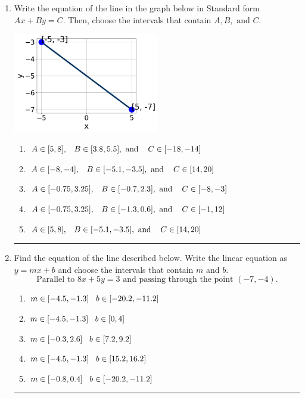 \documentclass[14pt]{extbook}
\newcommand{\litem}[1]{\item#1\hspace*{-1cm}\rule{\textwidth}{0.4pt}}
\begin{document}
\begin{enumerate}
{\begin{enumerate}[label=\Alph*.]
\end{enumerate} }
\litem{
Write the equation of the line in the graph below in Standard form $Ax+By=C$. Then, choose the intervals that contain $A, B, \text{ and } C$.
\begin{center}
    \includegraphics[width=0.5\textwidth]{../Figures/linearGraphToStandardA.png}
\end{center}
\begin{enumerate}[label=\Alph*.]
\item \( A \in [5, 8], \hspace{3mm} B \in [3.8, 5.5], \text{ and } \hspace{3mm} C \in [-18, -14] \)
\item \( A \in [-8, -4], \hspace{3mm} B \in [-5.1, -3.5], \text{ and } \hspace{3mm} C \in [14, 20] \)
\item \( A \in [-0.75, 3.25], \hspace{3mm} B \in [-0.7, 2.3], \text{ and } \hspace{3mm} C \in [-8, -3] \)
\item \( A \in [-0.75, 3.25], \hspace{3mm} B \in [-1.3, 0.6], \text{ and } \hspace{3mm} C \in [-1, 12] \)
\item \( A \in [5, 8], \hspace{3mm} B \in [-5.1, -3.5], \text{ and } \hspace{3mm} C \in [14, 20] \)

\end{enumerate} }
\litem{
Find the equation of the line described below. Write the linear equation as $ y=mx+b $ and choose the intervals that contain $m$ and $b$.\[ \text{Parallel to } 8 x + 5 y = 3 \text{ and passing through the point } (-7, -4). \]\begin{enumerate}[label=\Alph*.]
\item \( m \in [-4.5, -1.3] \hspace*{3mm} b \in [-20.2, -11.2] \)
\item \( m \in [-4.5, -1.3] \hspace*{3mm} b \in [0, 4] \)
\item \( m \in [-0.3, 2.6] \hspace*{3mm} b \in [7.2, 9.2] \)
\item \( m \in [-4.5, -1.3] \hspace*{3mm} b \in [15.2, 16.2] \)
\item \( m \in [-0.8, 0.4] \hspace*{3mm} b \in [-20.2, -11.2] \)


\end{enumerate}}
\end{enumerate}
\end{document}
